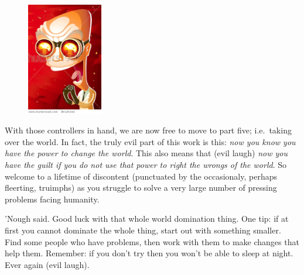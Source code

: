 \begin{figure}
\includegraphics[width=1.3in]{img/evillaugh.jpg}
\end{figure}

With those controllers in hand, we are now free to move to part five;
i.e.~taking over the world. In fact, the truly evil part of this work is
this: \emph{now you know you have the power to change the world}. This
also means that (evil laugh) \emph{now you have the guilt if you do not
use that power to right the wrongs of the world}. So welcome to a
lifetime of discontent (punctuated by the occasionaly, perhaps
fleerting, truimphs) as you struggle to solve a very large number of
pressing problems facing humanity.

'Nough said. Good luck with that whole world domination thing. One tip:
if at first you cannot dominate the whole thing, start out with
something smaller. Find some people who have problems, then work with
them to make changes that help them. Remember: if you don't try then you
won't be able to sleep at night. Ever again (evil laugh).
